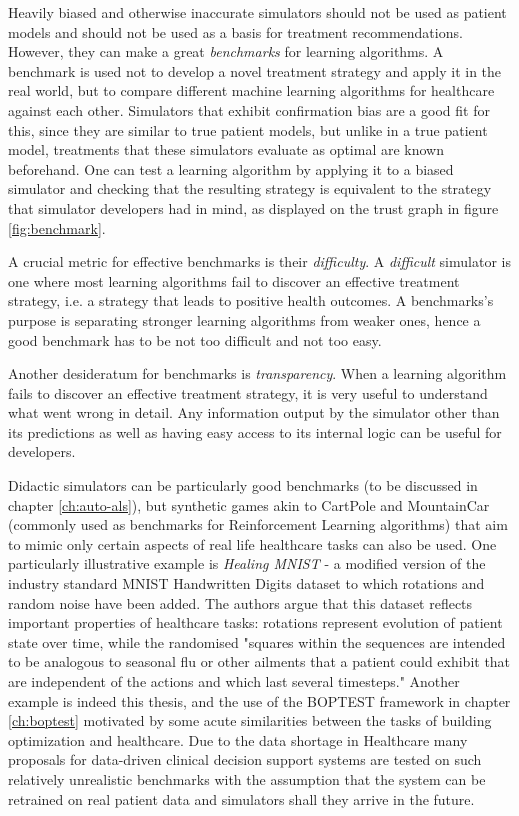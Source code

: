 Heavily biased and otherwise inaccurate simulators should not be used as patient models and should not be used as a basis for treatment recommendations.
However, they can make a great \emph{benchmarks} for learning algorithms.
A benchmark is used not to develop a novel treatment strategy and apply it in the real world, but to compare different machine learning algorithms for healthcare against each other.
Simulators that exhibit confirmation bias are a good fit for this, since they are similar to true patient models, but unlike in a true patient model, treatments that these simulators evaluate as optimal are known beforehand.
One can test a learning algorithm by applying it to a biased simulator and checking that the resulting strategy is equivalent to the strategy that simulator developers had in mind, as displayed on the trust graph in figure \ref{fig:benchmark}.

A crucial metric for effective benchmarks is their \emph{difficulty}.
A \emph{difficult} simulator is one where most learning algorithms fail to discover an effective treatment strategy, i.e. a strategy that leads to positive health outcomes.
A benchmarks's purpose is separating stronger learning algorithms from weaker ones, hence a good benchmark has to be not too difficult and not too easy.

Another desideratum for benchmarks is \emph{transparency}.
When a learning algorithm fails to discover an effective treatment strategy, it is very useful to understand what went wrong in detail.
Any information output by the simulator other than its predictions as well as having easy access to its internal logic can be useful for developers.

Didactic simulators can be particularly good benchmarks (to be discussed in chapter \ref{ch:auto-als}), but synthetic games akin to CartPole \cite{cartpole} and MountainCar \cite{mountain_car} (commonly used as benchmarks for Reinforcement Learning algorithms) that aim to mimic only certain aspects of real life healthcare tasks can also be used.
One particularly illustrative example is \emph{Healing MNIST} \cite{healing-mnist} - a modified version of the industry standard MNIST Handwritten Digits \cite{mnist} dataset to which rotations and random noise have been added.
The authors argue that this dataset reflects important properties of healthcare tasks: rotations represent evolution of patient state over time, while the randomised "squares within the sequences are intended to be analogous to seasonal flu or other ailments that a patient could exhibit that are independent of the actions and which last several timesteps."
Another example is indeed this thesis, and the use of the BOPTEST framework in chapter \ref{ch:boptest} motivated by some acute similarities between the tasks of building optimization and healthcare.
Due to the data shortage in Healthcare many proposals for data-driven clinical decision support systems are tested on such relatively unrealistic benchmarks with the assumption that the system can be retrained on real patient data and simulators shall they arrive in the future.

